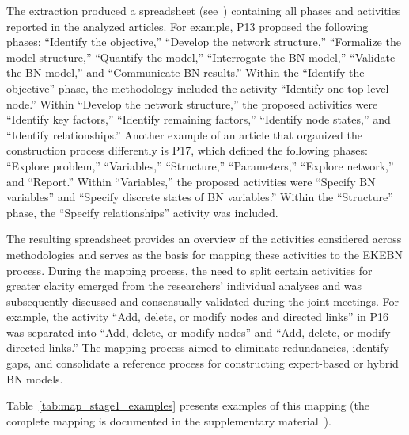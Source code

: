 The extraction produced a spreadsheet (see~\cite{rique2026supplementary}) containing all phases and activities reported in the analyzed articles. For example, P13 proposed the following phases: ``Identify the objective,'' ``Develop the network structure,'' ``Formalize the model structure,'' ``Quantify the model,'' ``Interrogate the BN model,'' ``Validate the BN model,'' and ``Communicate BN results.'' Within the ``Identify the objective'' phase, the methodology included the activity ``Identify one top-level node.'' Within ``Develop the network structure,'' the proposed activities were ``Identify key factors,'' ``Identify remaining factors,'' ``Identify node states,'' and ``Identify relationships.'' Another example of an article that organized the construction process differently is P17, which defined the following phases: ``Explore problem,'' ``Variables,'' ``Structure,'' ``Parameters,'' ``Explore network,'' and ``Report.'' Within ``Variables,'' the proposed activities were ``Specify BN variables'' and ``Specify discrete states of BN variables.'' Within the ``Structure'' phase, the ``Specify relationships'' activity was included.

The resulting spreadsheet provides an overview of the activities considered across methodologies and serves as the basis for mapping these activities to the EKEBN process. During the mapping process, the need to split certain activities for greater clarity emerged from the researchers' individual analyses and was subsequently discussed and consensually validated during the joint meetings. For example, the activity ``Add, delete, or modify nodes and directed links'' in P16 was separated into ``Add, delete, or modify nodes'' and ``Add, delete, or modify directed links.'' The mapping process aimed to eliminate redundancies, identify gaps, and consolidate a reference process for constructing expert-based or hybrid BN models. 

 Table~\ref{tab:map_stage1_examples} presents examples of this mapping (the complete mapping is documented in the supplementary material~\cite{rique2026supplementary}).

